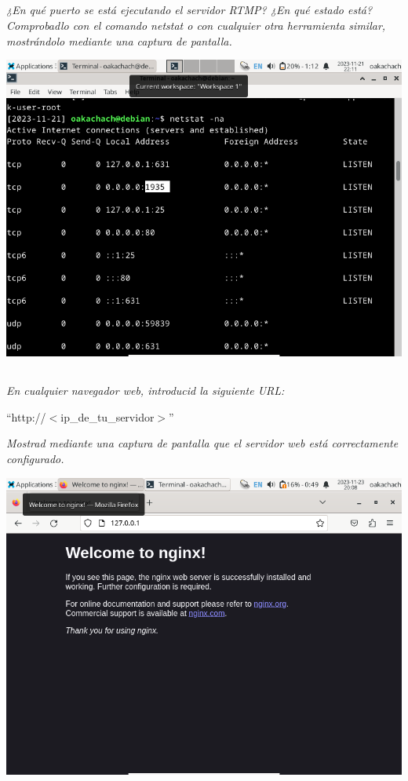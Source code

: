 \documentclass[spanish]{article}
\begin{document}
\subsection{}

\textit{¿En qué puerto se está ejecutando el servidor RTMP?
¿En qué estado está? Comprobadlo con el comando netstat o
con cualquier otra herramienta similar, mostrándolo mediante
una captura de pantalla.}

\begin{center}
\includegraphics[scale=0.45]{../img/3.png}
\end{center}

\subsection{}

\textit{En cualquier navegador web, introducid la siguiente
URL:}

\begin{center}
``http://\(<\)ip\_de\_tu\_servidor\(>\)''
\end{center}

\textit{Mostrad
mediante una captura de pantalla que el servidor web está
correctamente configurado.}

\begin{center}
\includegraphics[scale=0.45]{../img/4.png}
\end{center}
\end{document}
